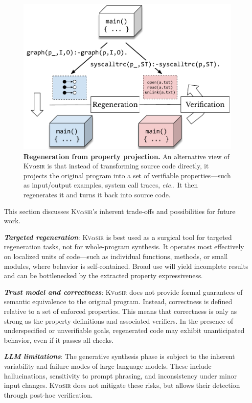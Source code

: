 \documentclass[nonacm,sigplan]{acmart}
\def\etc{{\em etc.}\xspace}
\newcommand{\sys}{{\scshape Kv{$\alpha$}sir}\xspace}
\newcommand{\heading}[1]{\vspace{2pt}\noindent\textbf{\emph{#1}}:\enspace}
\begin{document}
\begin{figure}[t]
  \includegraphics[width=.8\columnwidth]{figs/kvasir_projection.pdf}
  \caption{\textbf{Regeneration from property projection.}
  An alternative view of \sys is that instead of transforming source code directly, it projects the original
  program into a set of verifiable properties---such as input/output
  examples, system call traces, \etc.
  It then regenerates it and turns it back into source code.}
  \label{fig:projection}
\end{figure}

This section discusses \sys's inherent trade-offs and possibilities for future work.


\heading{Targeted regeneration}
\sys is best used as a surgical tool for targeted regeneration tasks, not for whole-program synthesis.
It operates most effectively on localized units of code---such as individual functions, methods, or small modules, where behavior is self-contained.
Broad use will yield incomplete results and can be bottlenecked by the extracted property expressiveness.

\heading{Trust model and correctness}
\sys
does not provide formal guarantees
of semantic equivalence
to the original program.
Instead,
correctness is defined relative to a set of enforced properties.
This means that correctness is only as strong as the property definitions and associated verifiers.
In the presence of underspecified or unverifiable goals,
regenerated code
may exhibit unanticipated behavior,
even if it passes all checks.

\heading{LLM limitations}
The generative synthesis phase
is subject to the inherent variability and failure modes
of large language models.
These include hallucinations,
sensitivity to prompt phrasing,
and inconsistency
under minor input changes.
\sys does not mitigate these risks,
but allows their detection
through post-hoc verification.
\end{document}
